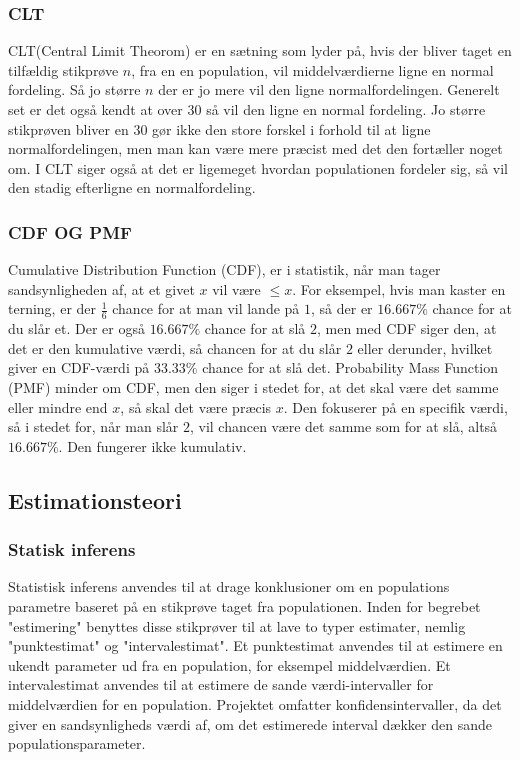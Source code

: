\subsubsection{CLT}
CLT(Central Limit Theorom) er en sætning som lyder på, hvis der bliver taget en tilfældig stikprøve $n$, fra en en population, vil middelværdierne ligne en normal fordeling. Så jo større $n$ der er jo mere vil den ligne normalfordelingen. Generelt set er det også kendt at over $30$ så vil den ligne en normal fordeling. Jo større stikprøven bliver en $30$ gør ikke den store forskel i forhold til at ligne normalfordelingen,  men man kan være mere præcist med det den fortæller noget om.
I CLT siger også at det er ligemeget hvordan populationen fordeler sig, så vil den stadig efterligne en normalfordeling.    

\subsubsection{CDF OG PMF}
Cumulative Distribution Function (CDF), er i statistik, når man tager sandsynligheden af, at et givet $x$ vil være $\leq x$. For eksempel, hvis man kaster en terning, er der $\frac{1}{6}$ chance for at man vil lande på $1$, så der er $16.667\%$ chance for at du slår et. Der er også $16.667\%$ chance for at slå $2$, men med CDF siger den, at det er den kumulative værdi, så chancen for at du slår $2$ eller derunder, hvilket giver en CDF-værdi på $33.33\%$ chance for at slå det.
Probability Mass Function (PMF) minder om CDF, men den siger i stedet for, at det skal være det samme eller mindre end $x$, så skal det være præcis $x$. Den fokuserer på en specifik værdi, så i stedet for, når man slår $2$, vil chancen være det samme som for at slå, altså $16.667\%$. Den fungerer ikke kumulativ.

\subsection{Estimationsteori}
\subsubsection{Statisk inferens}
Statistisk inferens anvendes til at drage konklusioner om en populations parametre baseret på en stikprøve taget fra populationen. Inden for begrebet "estimering" benyttes disse stikprøver til at lave to typer estimater, nemlig "punktestimat" og "intervalestimat".
Et punktestimat anvendes til at estimere en ukendt parameter ud fra en population, for eksempel middelværdien. Et intervalestimat anvendes til at estimere de sande værdi-intervaller for middelværdien for en population.
Projektet omfatter konfidensintervaller, da det giver en sandsynligheds værdi af, om det estimerede interval dækker den sande populationsparameter.

